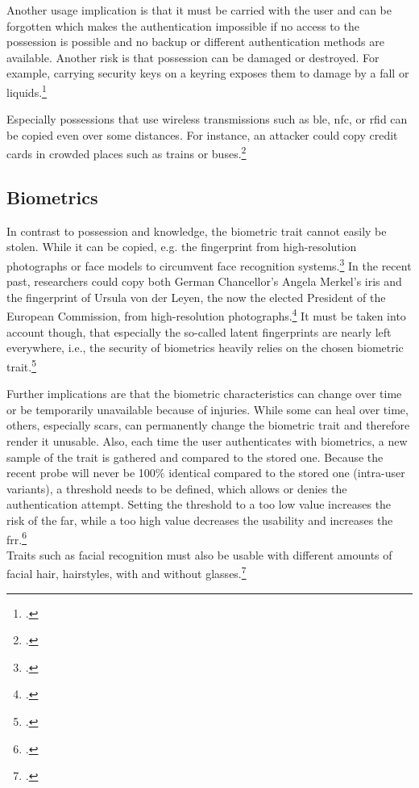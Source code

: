 Another usage implication is that it must be carried with the user and can be forgotten which makes the authentication impossible if no access to the possession is possible and no backup or different authentication methods are available. Another risk is that possession can be damaged or destroyed. For example, carrying security keys on a keyring exposes them to damage by a fall or liquids.\footcites[See][263--264]{shostack2014threat}

Especially possessions that use wireless transmissions such as \gls{ble}, \gls{nfc}, or \gls{rfid} can be copied even over some distances. For instance, an attacker could copy credit cards in crowded places such as trains or buses.\footcite{6892730}

\subsection{Biometrics}

In contrast to possession and knowledge, the biometric trait cannot easily be stolen. While it can be copied, e.g. the fingerprint from high-resolution photographs or 
face models to circumvent face recognition systems.\footcites[][]{185181}[][]{220566} In the recent past, researchers could copy both German Chancellor's Angela Merkel's iris and the fingerprint of Ursula von der Leyen, the now the elected President of the European Commission, from high-resolution photographs.\footcite{ccc-merkel} It must be taken into account though, that especially the so-called latent fingerprints are nearly left everywhere, i.e., the security of biometrics heavily relies on the chosen biometric trait.\footcite[See][299]{Vacca2017aa}

Further implications are that the biometric characteristics can change over time or be temporarily unavailable because of injuries. While some can heal over time, others, especially scars, can permanently change the biometric trait and therefore render it unusable. Also, each time the user authenticates with biometrics, a new sample of the trait is gathered and compared to the stored one. Because the recent probe will never be 100\% identical compared to the stored one (\frqq intra-user variants\flqq), a threshold needs to be defined, which allows or denies the authentication attempt. Setting the threshold to a too low value increases the risk of the \gls{far}, while a too high value decreases the usability and increases the \gls{frr}.\footcite[See][13--17, 52]{Jain2011}\\Traits such as facial recognition must also be usable with different amounts of facial hair, hairstyles, with and without glasses.\footcite[See][98]{Jain2011}

